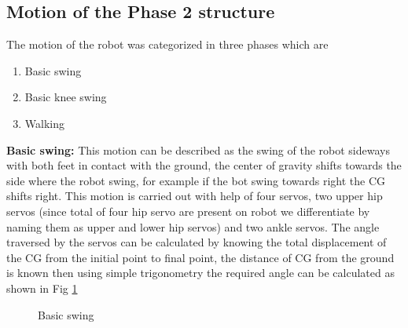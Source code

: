 \documentclass[12pt]{article}
\begin{document}
\subsection{Motion of the Phase 2 structure}
The motion of the robot was categorized in three phases which are
\begin{enumerate}
	\item Basic swing
	\item Basic knee swing
	\item Walking
\end{enumerate}
\textbf{Basic swing:} This motion can be described as the swing of the robot sideways with
both feet in contact with the ground, the center of gravity shifts towards the side where
the robot swing, for example if the bot swing towards right the CG shifts right. This
motion is carried out with help of four servos, two upper hip servos (since total of four
hip servo are present on robot we differentiate by naming them as upper and lower hip
servos) and two ankle servos. The angle traversed by the servos can be calculated by
knowing the total displacement of the CG from the initial point to final point, the
distance of CG from the ground is known then using simple trigonometry the required
angle can be calculated as shown in Fig \ref{fig:p2motion}
\begin{figure}[h!]
	
	\centering
	\hspace{2cm}
	\newline
	
	\caption{Basic swing}
	\label{fig:p2motion}
\end{figure}
\end{document}
